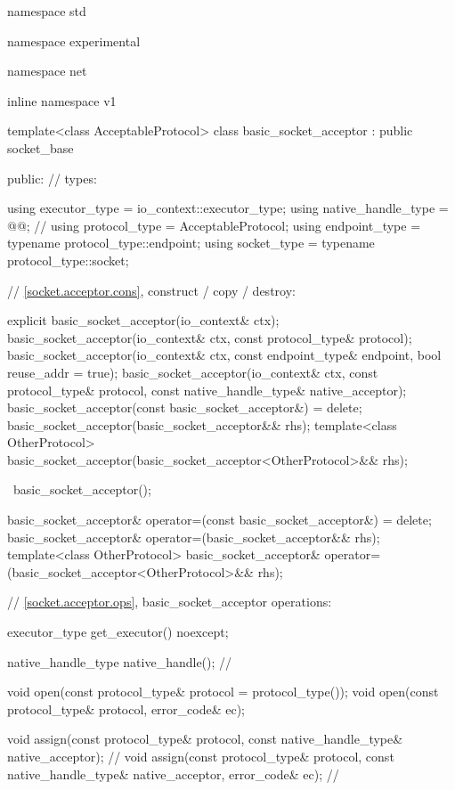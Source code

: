 \begin{codeblock}
namespace std {
namespace experimental {
namespace net {
inline namespace v1 {

  template<class AcceptableProtocol>
  class basic_socket_acceptor : public socket_base
  {
  public:
    // types:

    using executor_type = io_context::executor_type;
    using native_handle_type = @@; // \nativeref
    using protocol_type = AcceptableProtocol;
    using endpoint_type = typename protocol_type::endpoint;
    using socket_type = typename protocol_type::socket;

    // \ref{socket.acceptor.cons}, construct / copy / destroy:

    explicit basic_socket_acceptor(io_context& ctx);
    basic_socket_acceptor(io_context& ctx, const protocol_type& protocol);
    basic_socket_acceptor(io_context& ctx, const endpoint_type& endpoint,
                          bool reuse_addr = true);
    basic_socket_acceptor(io_context& ctx, const protocol_type& protocol,
                          const native_handle_type& native_acceptor);
    basic_socket_acceptor(const basic_socket_acceptor&) = delete;
    basic_socket_acceptor(basic_socket_acceptor&& rhs);
    template<class OtherProtocol>
      basic_socket_acceptor(basic_socket_acceptor<OtherProtocol>&& rhs);

    ~basic_socket_acceptor();

    basic_socket_acceptor& operator=(const basic_socket_acceptor&) = delete;
    basic_socket_acceptor& operator=(basic_socket_acceptor&& rhs);
    template<class OtherProtocol>
      basic_socket_acceptor& operator=(basic_socket_acceptor<OtherProtocol>&& rhs);

    // \ref{socket.acceptor.ops}, basic_socket_acceptor operations:

    executor_type get_executor() noexcept;

    native_handle_type native_handle(); // \nativeref

    void open(const protocol_type& protocol = protocol_type());
    void open(const protocol_type& protocol, error_code& ec);

    void assign(const protocol_type& protocol,
                const native_handle_type& native_acceptor); // \nativeref
    void assign(const protocol_type& protocol,
                const native_handle_type& native_acceptor,
                error_code& ec); // \nativeref

}}}}}
\end{codeblock}
